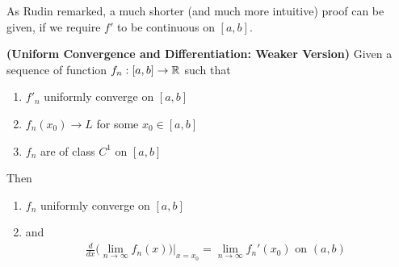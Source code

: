 \documentclass{report}
\begin{document}
\begin{mdframed}
As Rudin remarked, a much shorter (and much more intuitive) proof can be given, if we require $f'$ to be continuous on  $[a,b]$. 
\end{mdframed}
\begin{theorem}
\textbf{(Uniform Convergence and Differentiation: Weaker Version)} Given a sequence of function $f_n:[a,b]\rightarrow \mathbb{R}$ such that 
\begin{enumerate}[label=(\alph*)]
  \item $f'_n$ uniformly converge on  $[a,b]$
  \item $f_n(x_0)\to L$ for some $x_0 \in [a,b]$
  \item $f_n$ are of class $C^1$ on $[a,b]$ 
\end{enumerate}

Then 
\begin{enumerate}[label=(\alph*)]
  \item $f_n$ uniformly converge on  $[a,b]$ 
  \item and
\begin{align*}
\frac{d}{dx}\Big(\lim_{n\to \infty}f_n(x) \Big)\Big|_{x=x_0}=\lim_{n\to \infty}f_n'(x_0)\text{ on $(a,b)$ }
\end{align*}
\end{enumerate}
\end{theorem}
\end{document}
